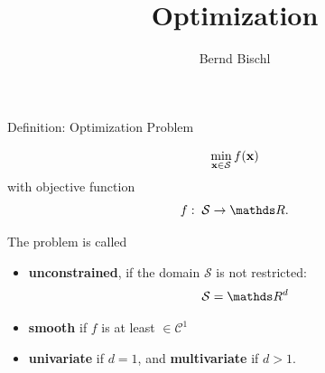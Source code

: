 





\newcommand{\titlefigure}{figure_man/ml_linreg_example_2.pdf}
\newcommand{\learninggoals}{
\item Definition
\item Max. Likelihood 
\item Normal regression
\item Risk Minimization
}



\title{Optimization}
\author{Bernd Bischl}
\date{}



\sloppy

\begin{vbframe}{Definition: Optimization Problem}

$$
\min_{\mathbf{x} \in \mathcal{S}} f(\mathbf{x})
$$
with objective function
$$
f: \; \mathcal{S} \to \R.
$$

\lz 

The problem is called

\begin{itemize}
	\item \textbf{unconstrained}, if the domain $\mathcal{S}$ is not restricted: 
	$$
		\mathcal{S} = \R^d
	$$
	\item \textbf{smooth} if $f$ is at least $\in \mathcal{C}^1$
	\item \textbf{univariate} if $d = 1$, and \textbf{multivariate} if $d > 1$.  
\end{itemize}

\end{vbframe}


	

